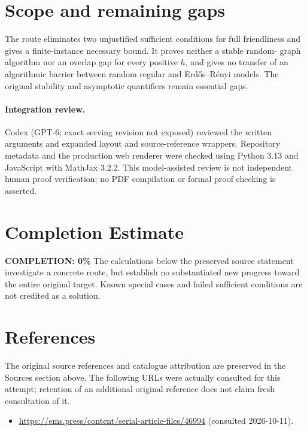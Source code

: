 \documentclass[11pt]{article}
\begin{document}
\section{Scope and remaining gaps}

The route eliminates two unjustified sufficient conditions for full friendliness
and gives a finite-instance necessary bound. It proves neither a stable random-
graph algorithm nor an overlap gap for every positive $h$, and gives no transfer
of an algorithmic barrier between random regular and Erd\H{o}s--R\'enyi models.
The original stability and asymptotic quantifiers remain essential gaps.

\paragraph{Integration review.} Codex (GPT-6; exact serving revision not exposed) reviewed the written arguments and expanded layout and source-reference wrappers. Repository metadata and the production web renderer were checked using Python 3.13 and JavaScript with MathJax 3.2.2. This model-assisted review is not independent human proof verification; no PDF compilation or formal proof checking is asserted.

\section{Completion Estimate}
\noindent\textbf{COMPLETION: 0\%}
The calculations below the preserved source statement investigate a concrete route,
but establish no substantiated new progress toward the entire original target.
Known special cases and failed sufficient conditions are not credited as a solution.
\section{References}
The original source references and catalogue attribution are preserved in the
Sources section above. The following URLs were actually consulted for this attempt;
retention of an additional original reference does not claim fresh consultation of it.
\begin{itemize}
\item \url{https://ems.press/content/serial-article-files/46994} (consulted 2026-10-11). 
\end{itemize}
\end{document}

